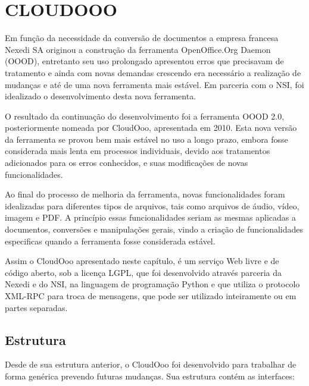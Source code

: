 \chapter{CLOUDOOO}
\thispagestyle{empty}

Em função da necessidade da conversão de documentos a empresa francesa Nexedi SA originou a construção da ferramenta OpenOffice.Org Daemon (OOOD), entretanto seu uso prolongado apresentou erros que precisavam de tratamento e ainda com novas demandas crescendo era necessário a realização de mudanças e até de uma nova ferramenta mais estável. Em parceria com o NSI, foi idealizado o desenvolvimento desta nova ferramenta.

O resultado da continuação do desenvolvimento foi a ferramenta OOOD 2.0, posteriormente nomeada por CloudOoo, apresentada em 2010. Esta nova versão da ferramenta se provou bem mais estável no uso a longo prazo, embora fosse considerada mais lenta em processos individuais, devido aos tratamentos adicionados para os erros conhecidos, e suas modificações de novas funcionalidades.

Ao final do processo de melhoria da ferramenta, novas funcionalidades foram idealizadas para diferentes tipos de arquivos, tais como arquivos de áudio, vídeo, imagem e PDF. A princípio essas funcionalidades seriam as mesmas aplicadas a documentos, conversões e manipulações gerais, vindo a criação de funcionalidades especificas quando a ferramenta fosse considerada estável.

Assim o CloudOoo apresentado neste capítulo, é um serviço Web livre e de código aberto, sob a licença LGPL, que foi desenvolvido através parceria da Nexedi e do NSI, na linguagem de programação Python e que utiliza o protocolo XML-RPC para troca de mensagens, que pode ser utilizado inteiramente ou em partes separadas.

\section{Estrutura}

Desde de sua estrutura anterior, o CloudOoo foi desenvolvido para trabalhar de forma genérica prevendo futuras mudanças. Sua estrutura contém as interfaces:


